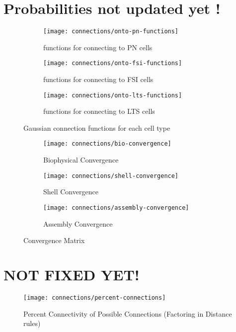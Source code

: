 \documentclass[12pt, letterpaper]{article}
\begin{document}
\section*{Probabilities not updated yet !}
\begin{figure}[H]
  \centering
  \begin{subfigure}{0.4\textwidth}
    \centering
    \texttt{[image: connections/onto-pn-functions]}
    \caption{functions for connecting to PN cells}
    \label{fig:Gaussian PN}
  \end{subfigure}
  \begin{subfigure}{.4\textwidth}
    \centering
    \texttt{[image: connections/onto-fsi-functions]}
    \caption{functions for connecting to FSI cells}
    \label{fig:Gaussian FSI}
  \end{subfigure}
  \begin{subfigure}{.4\textwidth}
    \centering
    \texttt{[image: connections/onto-lts-functions]}
    \caption{functions for connecting to LTS cells}
    \label{fig:Gaussian LTS}
  \end{subfigure}
  \caption{Gaussian connection functions for each cell type}
  \label{fig:Gaussian connection functions}
\end{figure}


\begin{figure}[H]
    \centering
    \begin{subfigure}{.5\textwidth}
      \centering
      \texttt{[image: connections/bio-convergence]}
      \caption{Biophysical Convergence}
      \label{fig:sub1}
    \end{subfigure}
    \begin{subfigure}{.5\textwidth}
      \centering
      \texttt{[image: connections/shell-convergence]}
      \caption{Shell Convergence}
      \label{fig:sub2}
    \end{subfigure}
    \begin{subfigure}{.5\textwidth}
      \centering
      \texttt{[image: connections/assembly-convergence]}
      \caption{Assembly Convergence}
      \label{fig:sub3}
    \end{subfigure}
    \caption{Convergence Matrix}
    \label{fig:test}
\end{figure}


\section*{NOT FIXED YET!}
\begin{figure}[H]
    \centering
    \texttt{[image: connections/percent-connections]}
    \caption{Percent Connectivity of Possible Connections (Factoring in Distance rules)}
    \label{fig:percentconns}
\end{figure}
\end{document}
